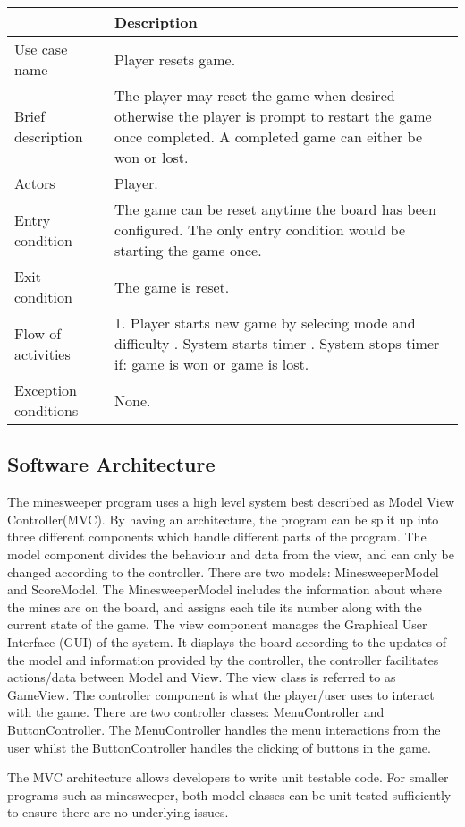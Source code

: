 \documentclass[12pt, a4]{report}
\begin{document}
	\begin{table}[ht]
	\begin{tabular}{|p{4cm}|p{12cm}|}
		\hline
		& Description \\
		\hline
		Use case name & Player resets game. \\
		Brief description & The player may reset the game when desired otherwise the player is prompt to restart the game once completed. A completed game can either be won or lost. \\
		Actors & Player. \\
		Entry condition & The game can be reset anytime the board has been configured. The only entry condition would be starting the game once. \\
		Exit condition & The game is reset. \\
		Flow of activities & 1. Player starts new game by selecing mode and difficulty \newline 2. System starts timer \newline 3. System stops timer if: game is won or game is lost. \\
		Exception conditions & None.\\
		\hline
	\end{tabular}
	\end{table}
	
	\pagebreak
	
	\subsection{Software Architecture}
	
	\par The minesweeper program uses a high level system best described as Model View Controller(MVC). By having an architecture, the program can be split up into three different components which handle different parts of the program. The model component divides the behaviour and data from the view, and can only be changed according to the controller. There are two models: MinesweeperModel and ScoreModel. The MinesweeperModel includes the information about where the mines are on the board, and assigns each tile its number along with the current state of the game. The view component manages the Graphical User Interface (GUI) of the system. It displays the board according to the updates of the model and information provided by the controller, the controller facilitates actions/data between Model and View. The view class is referred to as GameView. The controller component is what the player/user uses to interact with the game. There are two controller classes: MenuController and ButtonController. The MenuController handles the menu interactions from the user whilst the ButtonController handles the clicking of buttons in the game.
	\newline
	\par The MVC architecture allows developers to write unit testable code. For smaller programs such as minesweeper, both model classes can be unit tested sufficiently to ensure there are no underlying issues. 
	
\end{document}
